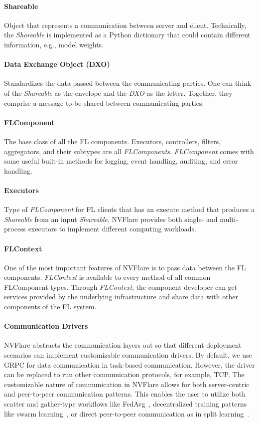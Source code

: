 \documentclass[11pt]{article}
\begin{document}
\paragraph{Shareable} Object that represents a communication between server and client. Technically, the \textit{Shareable} is implemented as a Python dictionary that could contain different information, e.g., model weights.

\paragraph{Data Exchange Object (DXO)} Standardizes the data passed between the communicating parties. One can think of the \textit{Shareable} as the envelope and the \textit{DXO} as the letter. Together, they comprise a message to be shared between communicating parties.

\paragraph{FLComponent} The base class of all the FL components. Executors, controllers, filters, aggregators, and their subtypes are all \textit{FLComponents}.
\textit{FLComponent} comes with some useful built-in methods for logging, event handling, auditing, and error handling.

\paragraph{Executors} Type of \textit{FLComponent} for FL clients that has an execute method that produces a \textit{Shareable} from an input \textit{Shareable}. NVFlare provides both single- and multi-process executors to implement different computing workloads.

\paragraph{FLContext} One of the most important features of NVFlare is to pass data between the FL components. \textit{FLContext} is available to every method of all common FLComponent types. Through \textit{FLContext}, the component developer can get services provided by the underlying infrastructure and share data with other components of the FL system.

\paragraph{Communication Drivers}
NVFlare abstracts the communication layers out so that different deployment scenarios can implement customizable communication drivers. By default, we use GRPC for data communication in task-based communication. However, the driver can be replaced to run other communication protocols, for example, TCP. The customizable nature of communication in NVFlare allows for both server-centric and peer-to-peer communication patterns. This enables the user to utilize both scatter and gather-type workflows like FedAvg~\cite{mcmahan2017communication}, decentralized training patterns like swarm learning~\cite{warnat2021swarm}, or direct peer-to-peer communication as in split learning~\cite{gupta2018distributed}.
\end{document}
